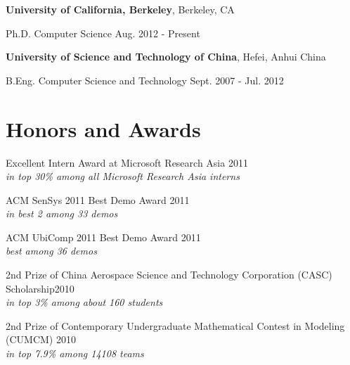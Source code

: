 \documentclass[margin,line]{res}
\newenvironment{list1}{
  \begin{list}{\ding{113}}{
      \setlength{\itemsep}{0in}
      \setlength{\parsep}{0in} \setlength{\parskip}{0in}
      \setlength{\topsep}{0in} \setlength{\partopsep}{0in}
      \setlength{\leftmargin}{0.17in}}}{\end{list}}
\begin{document}
\begin{resume}
      {\bf University of California, Berkeley}, Berkeley, CA \\
      \vspace*{-.1in}
      \begin{list1}
        \item[] Ph.D. Computer Science \hfill Aug. 2012 - Present \\
      \end{list1}

      \vspace*{-5.5mm}
      {\bf University of Science and Technology of China}, Hefei, Anhui China \\
      \vspace*{-.1in}
      \begin{list1}
        \item[] B.Eng. Computer Science and Technology \hfill Sept. 2007 - Jul. 2012 \\
      \end{list1}

    \section{\sc Honors and Awards}

      Excellent Intern Award at Microsoft Research Asia \hfill 2011\\
      {\it in top 30\% among all Microsoft Research Asia interns}

      \vspace*{-2.5mm}
      ACM SenSys 2011 Best Demo Award \hfill 2011\\
      {\it in best 2 among 33 demos}

      \vspace*{-2.5mm}
      ACM UbiComp 2011 Best Demo Award \hfill 2011\\
      {\it best among 36 demos}

      \vspace*{-2.5mm}
      2nd Prize of China Aerospace Science and Technology Corporation (CASC) Scholarship\hfill 2010\\
      {\it in top 3\% among about 160 students}

      \vspace*{-2.5mm}
      2nd Prize of Contemporary Undergraduate Mathematical Contest in Modeling (CUMCM) \hfill 2010\\
      {\it in top 7.9\% among 14108 teams}


\end{resume}
\end{document}
